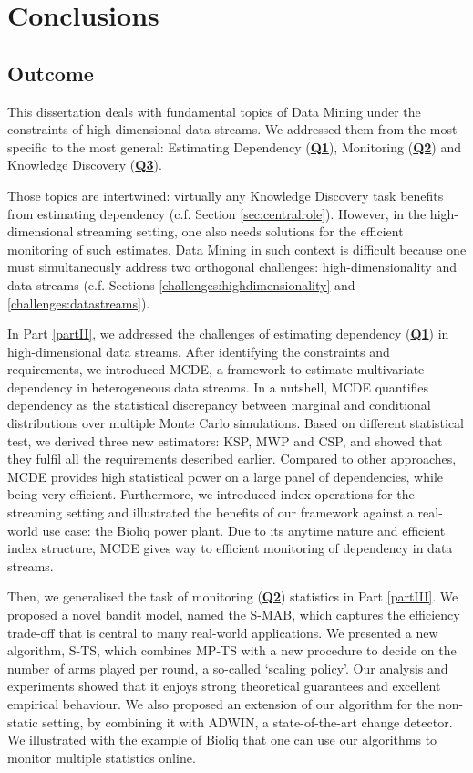 
\part{Conclusions}
\label{partV}

\chapter{Outcome}
\glsresetall
\label{chapter:summary}

This dissertation deals with fundamental topics of Data Mining under the constraints of high-dimensional data streams. We addressed them from the most specific to the most general: Estimating Dependency (\hyperlink{Q1}{\textbf{Q1}}), Monitoring (\hyperlink{Q2}{\textbf{Q2}}) and Knowledge Discovery (\hyperlink{Q3}{\textbf{Q3}}). 

Those topics are intertwined: virtually any Knowledge Discovery task benefits from estimating dependency (c.f. Section \ref{sec:centralrole}). However, in the high-dimensional streaming setting, one also needs solutions for the efficient monitoring of such estimates. Data Mining in such context is difficult because one must simultaneously address two orthogonal challenges: high-dimensionality and data streams (c.f. Sections \ref{challenges:highdimensionality} and \ref{challenges:datastreams}). 

In Part \ref{partII}, we addressed the challenges of estimating dependency (\hyperlink{Q1}{\textbf{Q1}}) in high-dimensional data streams. After identifying the constraints and requirements, we introduced \gls{MCDE}, a framework to estimate multivariate dependency in heterogeneous data streams. In a nutshell, \gls{MCDE} quantifies dependency as the statistical discrepancy between marginal and conditional distributions over multiple Monte Carlo simulations. Based on different statistical test, we derived three new estimators: \gls{KSP}, \gls{MWP} and \gls{CSP}, and showed that they fulfil all the requirements described earlier. Compared to other approaches, \gls{MCDE} provides high statistical power on a large panel of dependencies, while being very efficient. Furthermore, we introduced index operations for the streaming setting and illustrated the benefits of our framework against a real-world use case: the \acrshort{Bioliq} power plant. Due to its anytime nature and efficient index structure, \gls{MCDE} gives way to efficient monitoring of dependency in data streams. 

Then, we generalised the task of monitoring (\hyperlink{Q2}{\textbf{Q2}}) statistics in Part \ref{partIII}. We proposed a novel bandit model, named the \gls{S-MAB}, which captures the efficiency trade-off that is central to many real-world applications. We presented a new algorithm, \gls{S-TS}, which combines \gls{MP-TS} with a new procedure to decide on the number of arms played per round, a so-called `scaling policy'. Our analysis and experiments showed that it enjoys strong theoretical guarantees and excellent empirical behaviour. We also proposed an extension of our algorithm for the non-static setting, by combining it with \gls{ADWIN}, a state-of-the-art change detector. We illustrated with the example of \gls{Bioliq} that one can use our algorithms to monitor multiple statistics online.   

